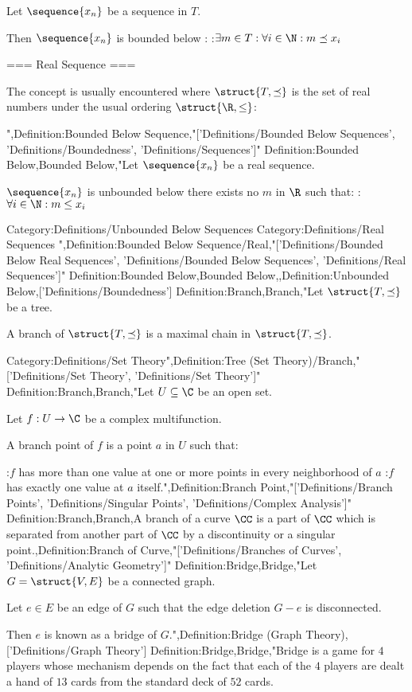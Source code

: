 Let $\sequence {x_n}$ be a sequence in $T$.


Then $\sequence {x_n}$ is bounded below :
:$\exists m \in T: \forall i \in \N: m \preceq x_i$


=== Real Sequence ===

The concept is usually encountered where $\struct {T, \preceq}$ is the set of real numbers under the usual ordering $\struct {\R, \le}$:

",Definition:Bounded Below Sequence,"['Definitions/Bounded Below Sequences', 'Definitions/Boundedness', 'Definitions/Sequences']"
Definition:Bounded Below,Bounded Below,"Let $\sequence {x_n}$ be a real sequence.


$\sequence {x_n}$ is unbounded below  there exists no $m$ in $\R$ such that:
:$\forall i \in \N: m \le x_i$


Category:Definitions/Unbounded Below Sequences
Category:Definitions/Real Sequences
",Definition:Bounded Below Sequence/Real,"['Definitions/Bounded Below Real Sequences', 'Definitions/Bounded Below Sequences', 'Definitions/Real Sequences']"
Definition:Bounded Below,Bounded Below,,Definition:Unbounded Below,['Definitions/Boundedness']
Definition:Branch,Branch,"Let $\struct {T, \preceq}$ be a tree.

A branch of $\struct {T, \preceq}$ is a maximal chain in $\struct {T, \preceq}$.


Category:Definitions/Set Theory",Definition:Tree (Set Theory)/Branch,"['Definitions/Set Theory', 'Definitions/Set Theory']"
Definition:Branch,Branch,"Let $U \subseteq \C$ be an open set.

Let $f : U \to \C$ be a complex multifunction.


A branch point of $f$ is a point $a$ in $U$ such that:

:$f$ has more than one value at one or more points in every neighborhood of $a$
:$f$ has exactly one value at $a$ itself.",Definition:Branch Point,"['Definitions/Branch Points', 'Definitions/Singular Points', 'Definitions/Complex Analysis']"
Definition:Branch,Branch,A branch of a curve $\CC$ is a part of $\CC$ which is separated from another part of $\CC$ by a discontinuity or a singular point.,Definition:Branch of Curve,"['Definitions/Branches of Curves', 'Definitions/Analytic Geometry']"
Definition:Bridge,Bridge,"Let $G = \struct {V, E}$ be a connected graph.

Let $e \in E$ be an edge of $G$ such that the edge deletion $G - e$ is disconnected.


Then $e$ is known as a bridge of $G$.",Definition:Bridge (Graph Theory),['Definitions/Graph Theory']
Definition:Bridge,Bridge,"Bridge is a game for $4$ players whose mechanism depends on the fact that each of the $4$ players are dealt a hand of $13$ cards from the standard deck of $52$ cards.


